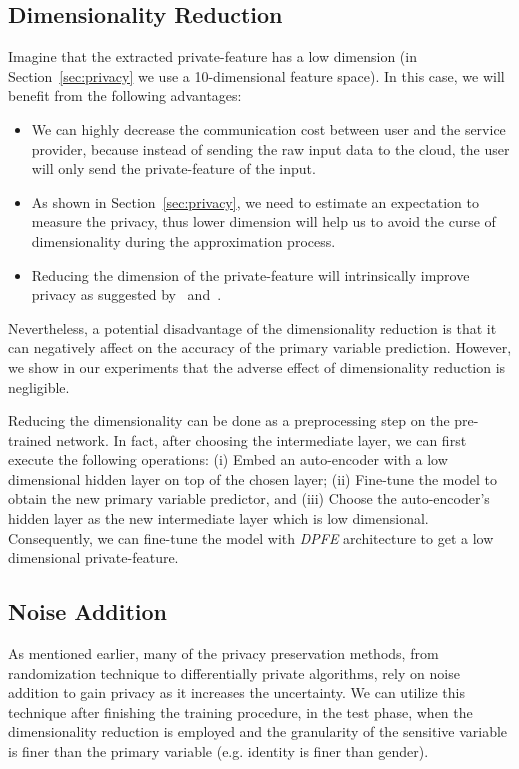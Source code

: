 \documentclass[10pt,journal,compsoc]{IEEEtran}
\begin{document}
\subsection{Dimensionality Reduction}

Imagine that the extracted private-feature has a low dimension (in Section~\ref{sec:privacy} we use a 10-dimensional feature space). In this case, we will benefit from the following advantages: 
\begin{itemize}
	\item We can highly decrease the communication cost between user and the service provider, because instead of sending the raw input data to the cloud, the user will only send the private-feature of the input.
	\item As shown in Section~\ref{sec:privacy}, we need to estimate an expectation to measure the privacy, thus lower dimension will help us to avoid the curse of dimensionality during the approximation process.
	\item Reducing the dimension of the private-feature will intrinsically improve privacy as suggested by~\cite{osia2017_2} and~\cite{malekzadeh2017}.
\end{itemize}
Nevertheless, a potential disadvantage of the dimensionality reduction is that it can negatively affect on the accuracy of the primary variable prediction. However, we show in our experiments that the adverse effect of dimensionality reduction is negligible.

Reducing the dimensionality can be done as a preprocessing step on the pre-trained network. In fact, after choosing the intermediate layer, we can first execute the following operations: (i) Embed an auto-encoder with a low dimensional hidden layer on top of the chosen layer; (ii) Fine-tune the model to obtain the new primary variable predictor, and (iii) Choose the auto-encoder's hidden layer as the new intermediate layer which is low dimensional. Consequently, we can fine-tune the model with \emph{DPFE} architecture to get a low dimensional private-feature.

\subsection{Noise Addition}\label{sec:noise}

As mentioned earlier, many of the privacy preservation methods, from randomization technique to differentially private algorithms, rely on noise addition to gain privacy as it increases the uncertainty. We can utilize this technique after finishing the training procedure, in the test phase, when the dimensionality reduction is employed and the granularity of the sensitive variable is finer than the primary variable (e.g. identity is finer than gender). 
\end{document}
